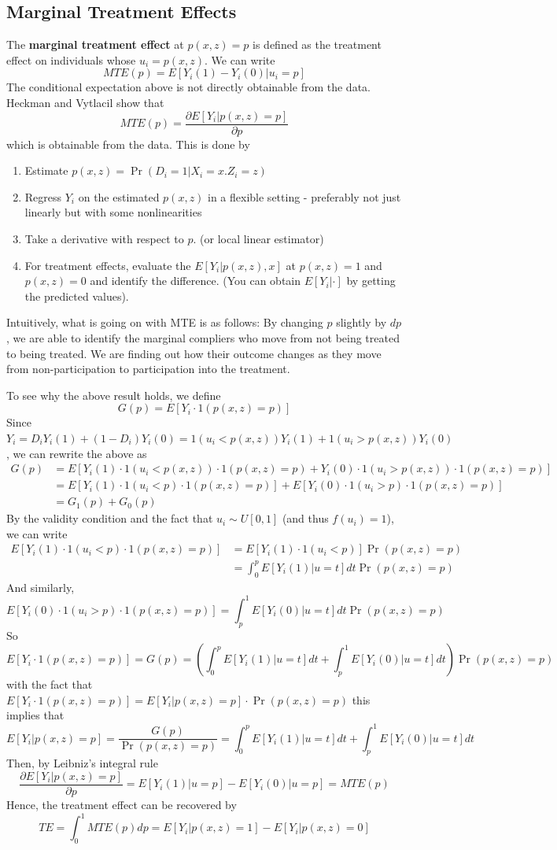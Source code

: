 \documentclass[12pt]{article}
\theoremstyle{definition}
\theoremstyle{property}
\theoremstyle{assumption}
\theoremstyle{example}
\theoremstyle{comment}
\begin{document}
\subsection{Marginal Treatment Effects}
The \textbf{marginal treatment effect} at $p(x,z)=p$ is defined as the treatment effect on individuals whose $u_i=p(x,z)$. We can write
\[
MTE(p)=E[Y_i(1)-Y_i(0)| u_i=p]
\]
The conditional expectation above is not directly obtainable from the data. Heckman and Vytlacil show that 
\[
MTE(p)=\frac{\partial E[Y_i | p(x,z)=p]}{\partial p}
\]
which is obtainable from the data. This is done by 
\begin{enumerate}
\item Estimate $p(x,z)=\Pr(D_i=1|X_i=x. Z_i=z)$
\item Regress $Y_i$ on the estimated $p(x,z)$ in a flexible setting - preferably not just linearly but with some nonlinearities
\item Take a derivative with respect to $p$. (or local linear estimator)
\item For treatment effects, evaluate the $E[Y_i|p(x,z),x]$ at $p(x,z)=1$ and $p(x,z)=0$ and identify the difference. (You can obtain $E[Y_i|\cdot]$ by getting the predicted values).  
\end{enumerate}
\par
Intuitively, what is going on with MTE is as follows: By changing $p$ slightly by $dp$, we are able to identify the marginal compliers who move from not being treated to being treated. We are finding out how their outcome changes as they move from non-participation to participation into the treatment. \par
To see why the above result holds, we define
\[
G(p)=E[Y_i\cdot 1(p(x,z)=p)]
\]
Since $Y_i=D_iY_i(1)+(1-D_i)Y_i(0)=1(u_i<p(x,z))Y_i(1)+1(u_i>p(x,z))Y_i(0)$, we can rewrite the above as
\begin{align*}
G(p)&=E[Y_i(1)\cdot 1(u_i<p(x,z))\cdot 1(p(x,z)=p)+Y_i(0)\cdot 1(u_i>p(x,z))\cdot 1(p(x,z)=p)]\\
&=E[Y_i(1)\cdot 1(u_i<p)\cdot 1(p(x,z)=p)]+E[Y_i(0)\cdot 1(u_i>p)\cdot 1(p(x,z)=p)]\\
&=G_1(p)+G_0(p)
\end{align*}
By the validity condition and the fact that $u_i\sim U[0,1]$ (and thus $f(u_i)=1$), we can write
\begin{align*}
E[Y_i(1)\cdot 1(u_i<p)\cdot 1(p(x,z)=p)]&=E[Y_i(1)\cdot 1(u_i<p)]\Pr(p(x,z)=p)\\
&=\int_0^pE[Y_i(1)|u=t]dt\Pr(p(x,z)=p)
\end{align*}
And similarly, 
\[
E[Y_i(0)\cdot 1(u_i>p)\cdot 1(p(x,z)=p)]=\int_p^1E[Y_i(0)|u=t]dt\Pr(p(x,z)=p)
\]
So 
\footnotesize{\[
E[Y_i\cdot 1(p(x,z)=p)]=G(p)=\left(\int_0^pE[Y_i(1)|u=t]dt+\int_p^1E[Y_i(0)|u=t]dt\right)\Pr(p(x,z)=p)
\]}\normalsize
with the fact that $E[Y_i\cdot 1(p(x,z)=p)]=E[Y_i|p(x,z)=p]\cdot \Pr(p(x,z)=p) $ this implies that
\footnotesize{\[
E[Y_i|p(x,z)=p]=\frac{G(p)}{\Pr(p(x,z)=p)}=\int_0^pE[Y_i(1)|u=t]dt+\int_p^1E[Y_i(0)|u=t]dt
\]}\normalsize
Then, by Leibniz's integral rule
\[
\frac{\partial E[Y_i | p(x,z)=p]}{\partial p}=E[Y_i(1)|u=p]-E[Y_i(0)|u=p]=MTE(p)
\]
Hence, the treatment effect can be recovered by
\[
TE=\int_0^1MTE(p)dp=E[Y_i|p(x,z)=1]-E[Y_i|p(x,z)=0]
\]
\end{document}
